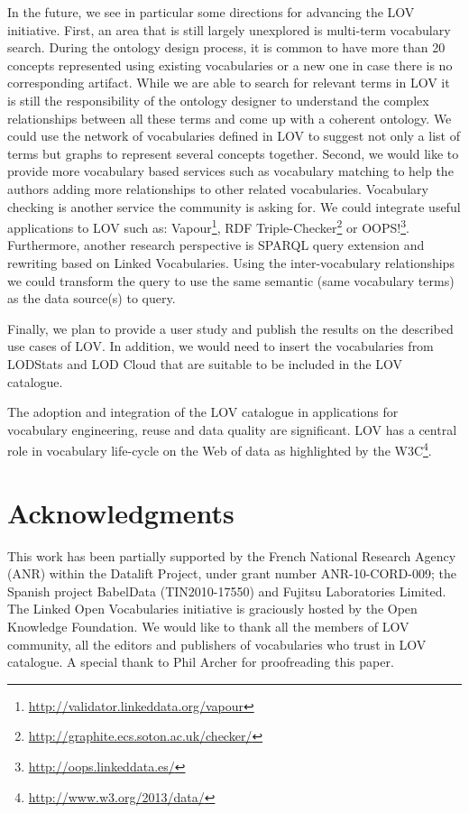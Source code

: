 \documentclass{iosart2c}
\begin{document}
In the future, we see in particular some directions for advancing the LOV initiative. First, an area that is still largely unexplored is multi-term vocabulary search. During the ontology design process, it is common to have more than 20 concepts represented using existing vocabularies or a new one in case there is no corresponding artifact. While we are able to search for relevant terms in LOV it is still the responsibility of the ontology designer to understand the complex relationships between all these terms and come up with a coherent ontology. We could use the network of vocabularies defined in LOV to suggest not only a list of terms but graphs to represent several concepts together. Second, we would like to provide more vocabulary based services such as vocabulary matching to help the authors adding more relationships to other related vocabularies. Vocabulary checking is another service the community is asking for. We could integrate useful applications to LOV such as: Vapour\footnote{\url{http://validator.linkeddata.org/vapour}}, RDF Triple-Checker\footnote{\url{http://graphite.ecs.soton.ac.uk/checker/}} or OOPS!\footnote{\url{http://oops.linkeddata.es/}}. Furthermore, another research perspective is SPARQL query extension and rewriting based on Linked Vocabularies. Using the inter-vocabulary relationships we could transform the query to use the same semantic (same vocabulary terms) as the data source(s) to query.

Finally, we plan to provide a user study and publish the results on the described use cases of LOV. In addition, we would need to insert the vocabularies from LODStats and LOD Cloud that are suitable to be included in the LOV catalogue.

The adoption and integration of the LOV catalogue in applications for vocabulary engineering, reuse and data quality are significant. LOV has a central role in vocabulary life-cycle on the Web of data as highlighted by the W3C\footnote{\url{http://www.w3.org/2013/data/}}. 


\section*{Acknowledgments}
This work has been partially supported by the French National Research Agency (ANR) within the Datalift Project, under grant number ANR-10-CORD-009; the Spanish project BabelData (TIN2010-17550) and Fujitsu Laboratories Limited. The Linked Open Vocabularies initiative is graciously hosted by the Open Knowledge Foundation. We would like to thank all the members of LOV community, all the editors and publishers of vocabularies who trust in LOV catalogue. A special thank to Phil Archer for proofreading this paper. 



\end{document}
